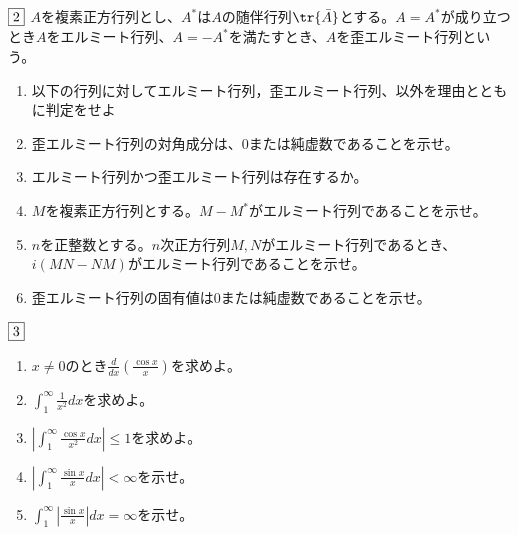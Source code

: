 \documentclass[dvipdfmx]{jsreport}
\begin{document}
\begin{tcolorbox} %
	$\fbox{2}$ $A$を複素正方行列とし、$A^*$は$A$の随伴行列$\tr{\bar{A}}$とする。$A= A^*$が成り立つとき$A$をエルミート行列、$A= -A^*$を満たすとき、$A$を歪エルミート行列という。
\begin{enumerate}
	\item 以下の行列に対してエルミート行列，歪エルミート行列、以外を理由とともに判定をせよ
	\item 歪エルミート行列の対角成分は、0または純虚数であることを示せ。
	\item エルミート行列かつ歪エルミート行列は存在するか。
	\item $M$を複素正方行列とする。$M- M^*$がエルミート行列であることを示せ。
	\item $n$を正整数とする。$n$次正方行列$M, N$がエルミート行列であるとき、$i(MN- NM)$がエルミート行列であることを示せ。
	\item 歪エルミート行列の固有値は0または純虚数であることを示せ。
\end{enumerate}
\end{tcolorbox}

\begin{souanswer} %

\end{souanswer}

\begin{tcolorbox} %
	$\fbox{3}$
\begin{enumerate}
	\item $x\ne 0$のとき$\frac{d}{dx}\left(\frac{\cos{x}}{x}\right)$を求めよ。
	\item $\int_1^\infty \frac{1}{x^2}dx$を求めよ。
	\item $\left|\int_1^\infty \frac{\cos{x}}{x^2}dx\right|\le 1$を求めよ。
	\item $\left|\int_1^\infty \frac{\sin{x}}{x} dx\right|< \infty$を示せ。
	\item $\int_1^\infty \left|\frac{\sin{x}}{x}\right|dx= \infty$を示せ。	
\end{enumerate}
\end{tcolorbox}
\end{document}
